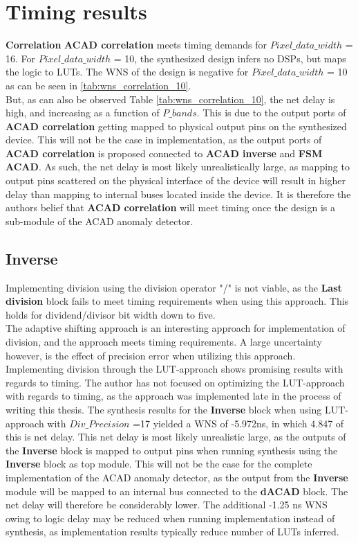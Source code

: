 \section{Timing results}
\textbf{Correlation}
\textbf{ACAD correlation} meets timing demands for $Pixel\_data\_width$ = 16. For $Pixel\_data\_width$ = 10, the synthesized design infers no DSPs, but maps the logic to LUTs. The WNS of the design is negative for $Pixel\_data\_width$ = 10 as can be seen in \ref{tab:wns_correlation_10}. 
\\
But, as can also be observed Table \ref{tab:wns_correlation_10}, the net delay is high, and increasing as a function of $P\_bands$. This is due to the output ports of \textbf{ACAD correlation} getting mapped to physical output pins on the synthesized device. This will not be the case in implementation, as the output ports of \textbf{ACAD correlation} is proposed connected to \textbf{ACAD inverse} and \textbf{FSM ACAD}. 
As such, the net delay is most likely unrealistically large, as mapping to output pins scattered on the physical interface of the device will result in higher delay than mapping to internal buses located inside the device. It is therefore the authors belief that \textbf{ACAD correlation} will meet timing once the design is a sub-module of the ACAD anomaly detector.  


\subsection{\textbf{Inverse}}
 Implementing division using the division operator "/" is not viable, as the \textbf{Last division} block fails to meet timing requirements when using this approach. This holds for dividend/divisor bit width down to five. \\

The adaptive shifting approach is an interesting approach for implementation of division, and the approach meets timing requirements. A large uncertainty however, is the effect of precision error when utilizing this approach.\\ 

Implementing division through the LUT-approach shows promising results with regards to timing. The author has not focused on optimizing the LUT-approach with regards to timing, as the approach was implemented late in the process of writing this thesis. The synthesis results for the \textbf{Inverse} block when using LUT-approach with $Div\_Precision$ =17 yielded a WNS of -5.972ns, in which 4.847 of this is net delay. This net delay is most likely unrealistic large, as the outputs of the \textbf{Inverse} block is mapped to output pins when running synthesis using the \textbf{Inverse} block as top module. This will not be the case for the complete implementation of the ACAD anomaly detector, as the output from the \textbf{Inverse} module will be mapped to an internal bus connected to the \textbf{dACAD} block. The net delay will therefore be considerably lower.  The additional -1.25 ns WNS owing to logic delay may be reduced when running implementation instead of synthesis, as implementation results typically reduce number of LUTs inferred.  \\